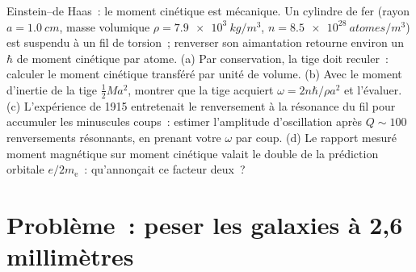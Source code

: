 \begin{exercise}[$\star\star\star$]\label{exo:b3:quantum-angular-momentum:12}
Einstein--de Haas~: le moment cinétique est mécanique. Un cylindre de
fer (rayon $a = \qty{1.0}{cm}$, masse volumique $\rho = \qty{7.9e3}{kg/m^3}$,
$n = \qty{8.5e28}{atomes/m^3}$) est suspendu à un fil de torsion~;
renverser son aimantation retourne environ un $\hbar$ de moment
cinétique par atome. (a) Par conservation, la tige doit reculer~:
calculer le moment cinétique transféré par unité de volume. (b) Avec le moment d'inertie de la tige $\tfrac12 M
a^2$, montrer que la tige acquiert $\omega = 2n\hbar/\rho a^2$ et
l'évaluer. (c) L'expérience de 1915 entretenait le renversement à la
résonance du fil pour accumuler les minuscules coups~: estimer
l'amplitude d'oscillation après $Q \sim 100$ renversements résonnants,
en prenant votre $\omega$ par coup. (d) Le rapport mesuré
moment magnétique sur moment cinétique valait le double de la
prédiction orbitale $e/2m_{\text{e}}$~: qu'annonçait ce facteur deux~?
\end{exercise}

\section{Problème~: peser les galaxies à 2,6 millimètres}


